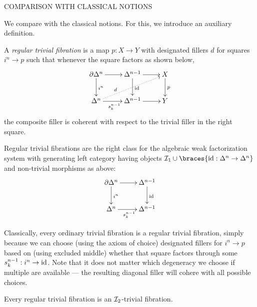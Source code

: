 \documentclass[reqno,10pt,a4paper,oneside]{amsart}
\begin{document}
COMPARISON WITH CLASSICAL NOTIONS

We compare with the classical notions. For this, we introduce an auxiliary definition.

\begin{definition}
A \emph{regular trivial fibration} is a map $p : X \to Y$ with designated fillers $d$ for squares $i^n \to p$ such that whenever the square factors as shown below,
\[
\xymatrix{
  \partial \Delta^n
  \ar[r]
  \ar[d]^{i^n}
&
  \Delta^{n-1}
  \ar[r]
  \ar[d]^{\id}
&
  X
  \ar[d]^{p}
\\
  \Delta^n
  \ar[r]_{s_k^{n-1}}
  \ar@{.>}[urr]^(0.3){d}
&
  \Delta^{n-1}
  \ar[r]
&
  Y
}
\]
the composite filler is coherent with respect to the trivial filler in the right square.
\end{definition}

Regular trivial fibrations are the right class for the algebraic weak factorization system with generating left category having objects $\cal{I}_1 \cup \braces{\id : \Delta^n \to \Delta^n}$ and non-trivial morphisms as above:
\[
\xymatrix{
  \partial \Delta^n
  \ar[r]
  \ar[d]^{i^n}
&
  \Delta^{n-1}
  \ar[d]^{\id}
\\
  \Delta^n
  \ar[r]_{s_k^{n-1}}
&
  \Delta^{n-1}
}
\]

Classically, every ordinary trivial fibration is a regular trivial fibration, simply because we can choose (using the axiom of choice) designated fillers for $i^n \to p$ based on (using excluded middle) whether that square factors through some $s_k^{n-1} : i^n \to \id$.
Note that it does not matter which degeneracy we choose if multiple are available --- the resulting diagonal filler will cohere with all possible choices.

\begin{lemma}
Every regular trivial fibration is an $\cal{I}_2$-trivial fibration.
\end{lemma}
\end{document}
